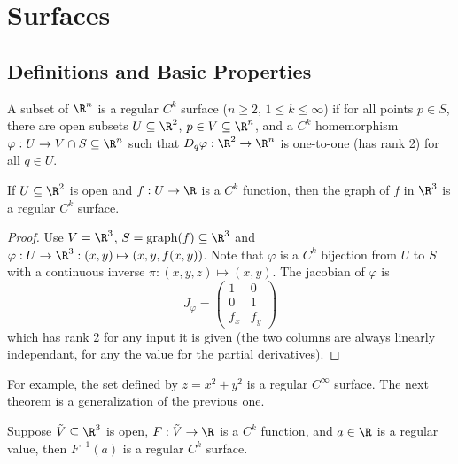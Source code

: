 \section{Surfaces}

\subsection{Definitions and Basic Properties}

\begin{definition}
    A subset of $\R^n$ is a regular $C^k$ surface ($n \geq 2$, $1 \leq k \leq \infty$) if for all points $p \in S$, there are open subsets $U \subseteq \R^2$, $p \in V \subseteq \R^n$, and a $C^k$ homemorphism $\varphi : U \to V \cap S \subseteq \R^n$ such that $D_q\varphi : \R^2 \to \R^n$ is one-to-one (has rank 2) for all $q \in U$.
\end{definition}

\begin{proposition}
    If $U \subseteq \R^2$ is open and $f : U \to \R$ is a $C^k$ function, then the graph of $f$ in $\R^3$ is a regular $C^k$ surface.
\end{proposition}

\begin{proof}
    Use $V = \R^3$, $S = \text{graph}(f) \subseteq \R^3$ and $\varphi : U \to \R^3 : (x,y) \mapsto (x,y,f(x,y))$. Note that $\varphi$ is a $C^k$ bijection from $U$ to $S$ with a continuous inverse $\pi: (x,y,z) \mapsto (x,y)$. The jacobian of $\varphi$ is
    $$J_{\varphi} = \begin{pmatrix}
        1 & 0 \\
        0 & 1 \\
        f_x & f_y
    \end{pmatrix}$$
    which has rank 2 for any input it is given (the two columns are always linearly independant, for any the value for the partial derivatives).
\end{proof}

For example, the set defined by $z = x^2 + y^2$ is a regular $C^{\infty}$ surface. The next theorem is a generalization of the previous one.

\begin{proposition}
    Suppose $\tilde{V} \subseteq \R^3$ is open, $F : \tilde{V} \to \R$ is a $C^k$ function, and $a \in \R$ is a regular value, then $F^{-1}(a)$ is a regular $C^k$ surface.
\end{proposition}

